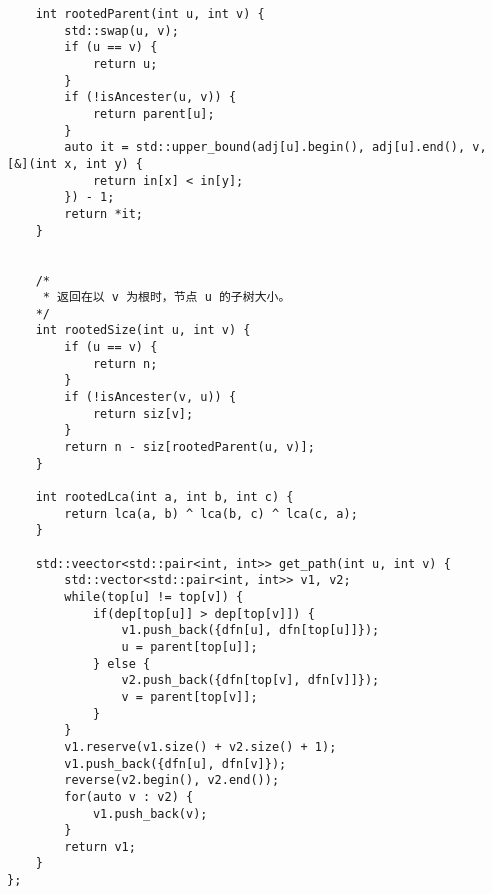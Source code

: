 \begin{lstlisting}
    int rootedParent(int u, int v) {
        std::swap(u, v);
        if (u == v) {
            return u;
        }
        if (!isAncester(u, v)) {
            return parent[u];
        }
        auto it = std::upper_bound(adj[u].begin(), adj[u].end(), v, [&](int x, int y) {
            return in[x] < in[y];
        }) - 1;
        return *it;
    }
    

    /*
     * 返回在以 v 为根时，节点 u 的子树大小。
    */
    int rootedSize(int u, int v) {
        if (u == v) {
            return n;
        }
        if (!isAncester(v, u)) {
            return siz[v];
        }
        return n - siz[rootedParent(u, v)];
    }
    
    int rootedLca(int a, int b, int c) {
        return lca(a, b) ^ lca(b, c) ^ lca(c, a);
    }

    std::veector<std::pair<int, int>> get_path(int u, int v) {
        std::vector<std::pair<int, int>> v1, v2;
        while(top[u] != top[v]) {
            if(dep[top[u]] > dep[top[v]]) {
                v1.push_back({dfn[u], dfn[top[u]]});
                u = parent[top[u]];
            } else {
                v2.push_back({dfn[top[v], dfn[v]]});
                v = parent[top[v]];
            }
        }
        v1.reserve(v1.size() + v2.size() + 1);
        v1.push_back({dfn[u], dfn[v]});
        reverse(v2.begin(), v2.end());
        for(auto v : v2) {
            v1.push_back(v);
        }
        return v1;
    }
};
\end{lstlisting}

